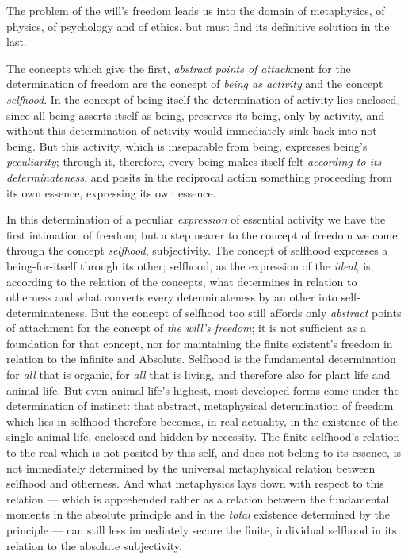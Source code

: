 \documentclass[12pt,a4paper]{book}
\begin{document}
The problem of the will's freedom leads us into the domain of metaphysics, of
physics, of psychology and of ethics, but must find its definitive solution in
the last.

The concepts which give the first, \emph{abstract points of attach}ment for the
determination of freedom are the concept of \emph{being as activity} and the
concept \emph{selfhood}. In the concept of being itself the determination of
activity lies enclosed, since all being asserts itself as being, preserves its
being, only by activity, and without this determination of activity would
immediately sink back into not-being. But this activity, which is inseparable
from being, expresses being's \emph{peculiarity}; through it, therefore, every
being makes itself felt \emph{according to its determinateness}, and posits in
the reciprocal action something proceeding from its own essence, expressing its
own essence.

In this determination of a peculiar \emph{expression} of essential activity we
have the first intimation of freedom; but a step nearer to the concept of
freedom we come through the concept \emph{selfhood}, subjectivity. The concept
of selfhood expresses a being-for-itself through its other; selfhood, as the
expression of the \emph{ideal}, is, according to the relation of the concepts,
what determines in relation to otherness and what converts
every determinateness by an other into self-determinateness. But the concept of
selfhood too still affords only \emph{abstract} points of attachment for the
concept of \emph{the will's freedom}; it is not sufficient as a foundation for
that concept, nor for maintaining the finite existent's freedom in relation to
the infinite and Absolute. Selfhood is the fundamental determination for
\emph{all} that is organic, for \emph{all} that is living, and therefore also
for plant life and animal life. But even animal life's highest, most developed
forms come under the determination of instinct: that abstract, metaphysical
determination of freedom which lies in selfhood therefore becomes, in real
actuality, in the existence of the single animal life, enclosed and hidden by
necessity. The finite selfhood's relation to the real which is not posited by
this self, and does not belong to its essence, is not immediately determined by
the universal metaphysical relation between selfhood and otherness. And what
metaphysics lays down with respect to this relation --- which is apprehended
rather as a relation between the fundamental moments in the absolute principle
and in the \emph{total} existence determined by the principle --- can still
less immediately secure the finite, individual selfhood in its relation to the
absolute subjectivity.
\end{document}
